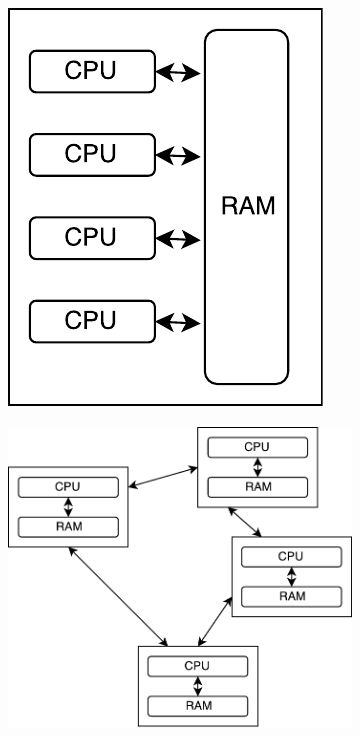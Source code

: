 

\begin{figure}[h]
	\centering
	\begin{subfigure}{0.4\textwidth}
		\centering
		\includegraphics[scale=0.6]{parallel.pdf}
		\subcaption{\label{subfigure_a}}
	\end{subfigure}
	\begin{subfigure}{0.5\textwidth}
		\centering
		\includegraphics[scale=0.5]{distributed.pdf}
		\subcaption{\label{subfigure_b}}

\end{subfigure}
\end{figure}
